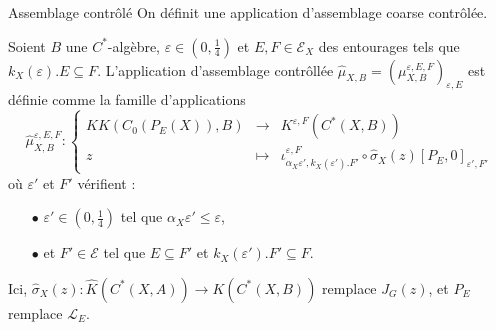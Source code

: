 \begin{frame}{Assemblage contrôlé}
On définit une application d'assemblage coarse contrôlée. 
\begin{definitionfr}
Soient $B$ une $C^*$-algèbre, $\varepsilon\in (0,\frac{1}{4})$ et $E,F\in\mathcal E_X$ des entourages tels que $k_X(\varepsilon).E\subseteq F$. L'application d'assemblage contrôllée $\hat\mu_{X,B}=(\mu_{X,B}^{\varepsilon,E,F})_{\varepsilon,E}$ est définie comme la famille d'applications
\[\hat\mu_{X,B}^{\varepsilon, E,F} :\left\{\begin{array}{rcl} KK(C_0(P_E(X)),B) & \rightarrow & K^{\varepsilon, F}(C^*(X,B)) \\
					z & \mapsto & \iota_{\alpha_X \varepsilon',k_X(\varepsilon').F'}^{\varepsilon,F}\circ\hat\sigma_X(z)[P_{E},0]_{\varepsilon', F'}\end{array}\right.\]
où $\varepsilon'$ et $F'$ vérifient :
\begin{itemize}
\item[$\bullet$] $\varepsilon'\in (0,\frac{1}{4})$ tel que $\alpha_X \varepsilon'\leq \varepsilon$,
\item[$\bullet$] et $F'\in\mathcal E$ tel que $E\subseteq F'$ et $k_X(\varepsilon').F'\subseteq F$.
\end{itemize}
\end{definitionfr}
\vspace{0.3 cm}
Ici, $\hat\sigma_X(z): \hat K(C^*(X,A)) \rightarrow K(C^*(X,B)) $ remplace $J_G(z)$, et $P_E$ remplace $\mathcal L_E$.\end{frame}
